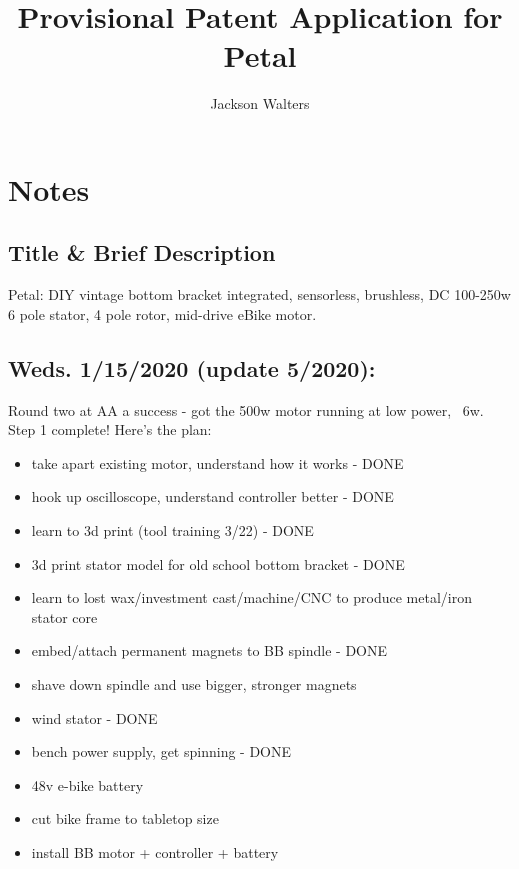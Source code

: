 \documentclass[11pt]{article} %
\title{Provisional Patent Application for Petal}
\author{Jackson Walters}
\begin{document}
\maketitle

\section*{Notes}


\subsection*{Title \& Brief Description}
\noindent Petal: DIY vintage bottom bracket integrated, sensorless, brushless, DC 100-250w 6 pole stator, 4 pole rotor, mid-drive eBike motor.



\subsection*{Weds. 1/15/2020 (update 5/2020):} Round two at AA a success - got the 500w motor running at low power, ~6w. Step 1 complete! Here’s the plan: \\

\begin{itemize}
\item take apart existing motor, understand how it works - DONE
\item hook up oscilloscope, understand controller better - DONE
\end{itemize}

\begin{itemize}
\item learn to 3d print (tool training 3/22) - DONE
\item 3d print stator model for old school bottom bracket - DONE
\end{itemize}

\begin{itemize}
\item learn to lost wax/investment cast/machine/CNC to produce metal/iron stator core
\item embed/attach permanent magnets to BB spindle - DONE
\item shave down spindle and use bigger, stronger magnets
\item wind stator - DONE
\end{itemize}

\vspace{5mm}

\begin{itemize}
\item bench power supply, get spinning - DONE
\item 48v e-bike battery
\item cut bike frame to tabletop size
\item install BB motor + controller + battery
\end{itemize}
\end{document}
